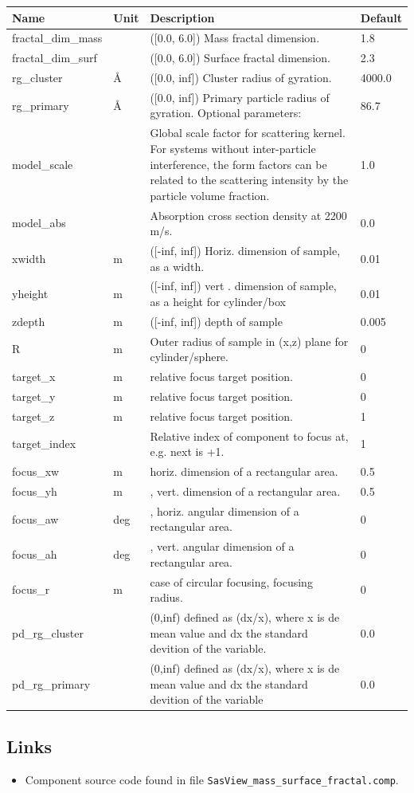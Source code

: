 \begin{longtable}{p{}p{}p{}p{}}
\toprule
\textbf{Name} & \textbf{Unit} & \textbf{Description} & \textbf{Default} \\
\midrule
\endhead
fractal\_dim\_mass &  & ([0.0, 6.0]) Mass fractal dimension. & 1.8 \\
fractal\_dim\_surf &  & ([0.0, 6.0]) Surface fractal dimension. & 2.3 \\
rg\_cluster & \AA{} & ([0.0, inf]) Cluster radius of gyration. & 4000.0 \\
rg\_primary & \AA{} & ([0.0, inf]) Primary particle radius of gyration. Optional parameters: & 86.7 \\
model\_scale &   & Global scale factor for scattering kernel. For systems without inter-particle interference, the form factors can be related to the scattering intensity by the particle volume fraction. & 1.0 \\
model\_abs &   & Absorption cross section density at 2200 m/s. & 0.0 \\
xwidth & m & ([-inf, inf]) Horiz. dimension of sample, as a width. & 0.01 \\
yheight & m & ([-inf, inf]) vert . dimension of sample, as a height for cylinder/box & 0.01 \\
zdepth & m & ([-inf, inf]) depth of sample & 0.005 \\
R & m & Outer radius of sample in (x,z) plane for cylinder/sphere. & 0 \\
target\_x & m & relative focus target position. & 0 \\
target\_y & m & relative focus target position. & 0 \\
target\_z & m & relative focus target position. & 1 \\
target\_index &   & Relative index of component to focus at, e.g. next is +1. & 1 \\
focus\_xw & m & horiz. dimension of a rectangular area. & 0.5 \\
focus\_yh & m & , vert. dimension of a rectangular area. & 0.5 \\
focus\_aw & deg & , horiz. angular dimension of a rectangular area. & 0 \\
focus\_ah & deg & , vert. angular dimension of a rectangular area. & 0 \\
focus\_r & m & case of circular focusing, focusing radius. & 0 \\
pd\_rg\_cluster &  & (0,inf) defined as (dx/x), where x is de mean value and dx the standard devition of the variable. & 0.0 \\
pd\_rg\_primary &  & (0,inf) defined as (dx/x), where x is de mean value and dx the standard devition of the variable & 0.0 \\
\bottomrule
\end{longtable}

\subsection*{Links}
\begin{itemize}
  \item Component source code found in file \texttt{SasView\_mass\_surface\_fractal.comp}.
\end{itemize}
